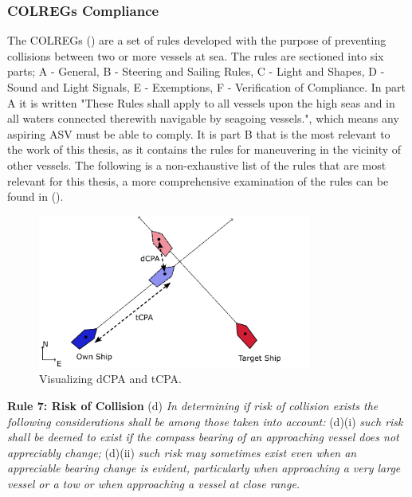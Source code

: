 \subsubsection*{COLREGs Compliance}
The \gls{COLREGs} (\cite{WikisourceCOLREGS}) are a set of rules developed with the purpose of preventing collisions between two or more vessels at sea.
The rules are sectioned into six parts; A - General, B - Steering and Sailing Rules, C - Light and Shapes, D - Sound and Light Signals, E - Exemptions,
F - Verification of Compliance. In part A it is written "These Rules shall apply to all vessels upon the high seas and in all waters connected therewith 
navigable by seagoing vessels.", which means any aspiring \gls{ASV} must be able to comply. It is part B that is the most relevant to the work of this thesis,
as it contains the rules for maneuvering in the vicinity of other vessels. The following is a non-exhaustive list of the rules that are most
relevant for this thesis, a more comprehensive examination of the rules can be found in (\cite{cockcroft2012manoeuvres}).

\begin{figure}[t!]
    \centering
    \includegraphics[width=0.8\textwidth]{Images/shipCPA.pdf}
    \caption{Visualizing dCPA and tCPA.}
    \label{FIG: ship CPA}
\end{figure}

\textbf{Rule 7: Risk of Collision}\newline
(d)\textit{ In determining if risk of collision exists the following considerations shall be among those taken into account:}\newline
(d)(i) \textit{such risk shall be deemed to exist if the compass bearing of an approaching vessel does not appreciably change;}\newline
(d)(ii) \textit{ such risk may sometimes exist even when an appreciable bearing change is evident, particularly when 
approaching a very large vessel or a tow or when approaching a vessel at close range.}

